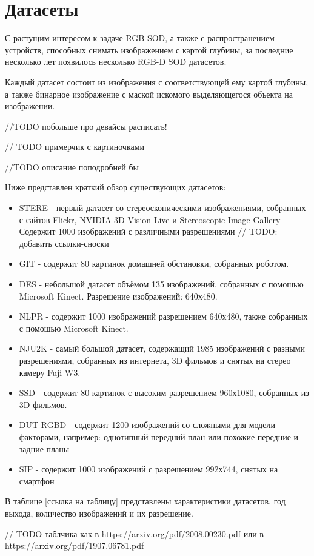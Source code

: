 \section{Датасеты}

С растущим интересом к задаче RGB-SOD, а также с распространением устройств, способных 
снимать изображением с картой глубины, за последние несколько лет появилось несколько RGB-D SOD датасетов.

Каждый датасет состоит из изображения с соответствующей ему картой глубины, а также
бинарное изображение с маской искомого выделяющегося объекта на изображении.

//TODO побольше про девайсы расписать!

// TODO примерчик с картиночками

//TODO описание поподробней бы

Ниже представлен краткий обзор существующих датасетов:
\begin{itemize}
    \item STERE \cite{STERE} - первый датасет со стереоскопическими изображениями, собранных с сайтов Flickr, NVIDIA 3D Vision Live и Stereoscopic Image Gallery
    Содержит 1000 изображений с различными разрешениями // TODO: добавить ссылки-сноски
    \item GIT \cite{GIT} - содержит 80 картинок домашней обстановки, собранных роботом.
    \item DES \cite{DES} - небольшой датасет объёмом 135 изображений, собранных с помошью Microsoft Kinect. Разрешение изображений: 640х480.
    \item NLPR \cite{NLPR} - содержит 1000 изображений разрешением 640х480, также собранных с помошью Microsoft Kinect.
    \item NJU2K \cite{NJU2K} - самый большой датасет, содержащий 1985 изображений с разными разрешениями, собранных из интернета, 3D фильмов и снятых на стерео камеру Fuji W3.
    \item SSD \cite{SSD} - содержит 80 картинок с высоким разрешением 960х1080, собранных из 3D фильмов.
    \item DUT-RGBD \cite{DUT} - содержит 1200 изображений со сложными для модели факторами, например: однотипный передний план или похожие передние и задние планы
    \item SIP \cite{Rethinking-RGBD} - содержит 1000 изображений с разрешением 992х744, снятых на смартфон
\end{itemize}

В таблице [ссылка на таблицу] представлены характеристики датасетов, год выхода, количество изображений и их разрешение.

// TODO таблчика как в https://arxiv.org/pdf/2008.00230.pdf или в https://arxiv.org/pdf/1907.06781.pdf